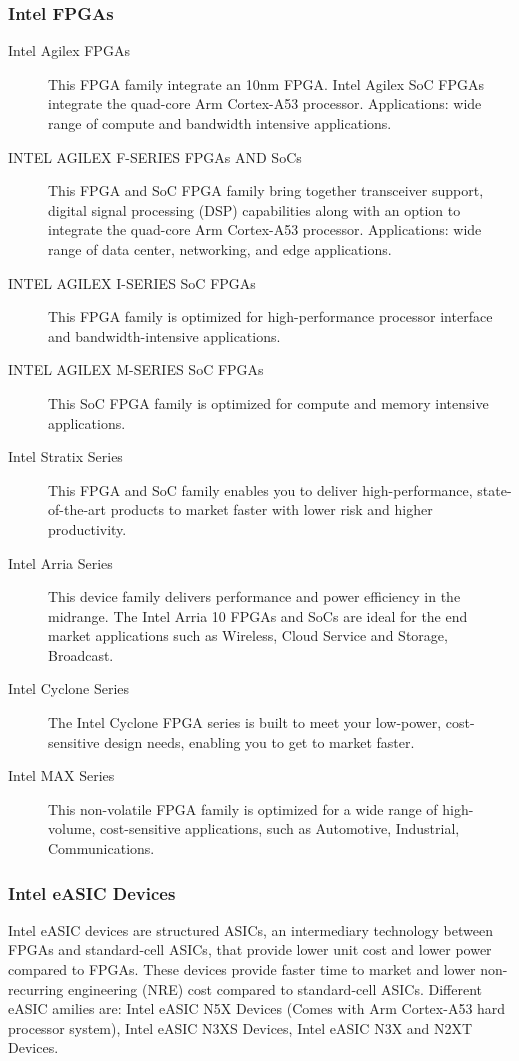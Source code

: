 \subsubsection{Intel FPGAs}
\begin{description}
    \item[Intel Agilex FPGAs] This FPGA family integrate an 10nm FPGA. Intel Agilex SoC FPGAs integrate the quad-core Arm Cortex-A53 processor. Applications: wide range of compute and bandwidth intensive applications. 
    \item[INTEL AGILEX F-SERIES FPGAs AND SoCs] This FPGA and SoC FPGA family bring together transceiver support, digital signal processing (DSP) capabilities along with an option to integrate the quad-core Arm Cortex-A53 processor. Applications: wide range of data center, networking, and edge applications.
    \item[INTEL AGILEX I-SERIES SoC FPGAs] This FPGA family is optimized for high-performance processor interface and bandwidth-intensive  applications.  
    \item[INTEL AGILEX M-SERIES SoC FPGAs] This SoC FPGA family is optimized for compute and memory intensive applications. 
    \item[Intel Stratix Series] This FPGA and SoC family enables you to deliver high-performance, state-of-the-art products to market faster with lower risk and higher productivity. 
    \item[Intel Arria Series] This device family delivers performance and power efficiency in the midrange. The Intel Arria 10 FPGAs and SoCs are ideal for the end market applications such as Wireless, Cloud Service and Storage, Broadcast.
    \item[Intel Cyclone Series] The Intel Cyclone FPGA series is built to meet your low-power, cost-sensitive design needs, enabling you to get to market faster.
    \item[Intel MAX Series] This non-volatile FPGA family is optimized for a wide range of high-volume, cost-sensitive applications, such as Automotive, Industrial, Communications.
\end{description}
\subsubsection{Intel eASIC Devices}
Intel eASIC devices are structured ASICs, an intermediary technology between FPGAs and standard-cell ASICs, that provide lower unit cost and lower power compared to FPGAs. These devices provide faster time to market and lower non-recurring engineering (NRE) cost compared to standard-cell ASICs.
Different eASIC amilies are: Intel eASIC N5X Devices (Comes with Arm Cortex-A53 hard processor system), Intel eASIC N3XS Devices, Intel eASIC N3X and N2XT Devices.